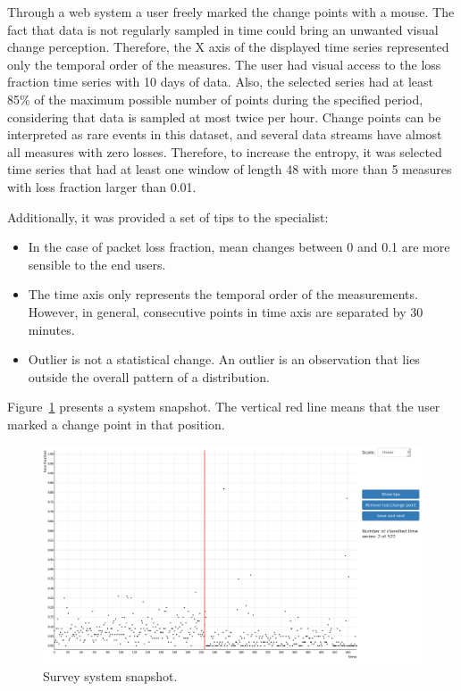 Through a web system a user freely marked the change points with a mouse.
The fact that data is not regularly sampled in time could bring an unwanted
visual change perception. Therefore, the X axis of the displayed time series
represented only the temporal order of the measures.
The user had visual access to the
loss fraction time series with 10 days of data.
Also, the selected series had at
least 85\% of the maximum possible number of points during the specified period,
considering that data is sampled at most twice per hour. Change points can
be interpreted as rare events in this dataset, and several data streams have
almost
all measures with zero losses. Therefore, to increase the entropy,
it was selected time series that had at least one window of length 48 with
more than 5 measures with loss fraction larger than 0.01.

Additionally, it was provided a set of tips to the specialist:

\begin{itemize}
    \item In the case of packet loss fraction, mean changes between 0 and 0.1
    are more sensible to the end users.
    \item The time axis only represents the temporal order of the measurements.
    However, in general, consecutive points in time axis are separated by 30
    minutes.
    \item Outlier is not a statistical change. An outlier is an observation that
    lies outside the overall pattern of a distribution.
\end{itemize}

Figure~\ref{fig:survey_system} presents a system snapshot.
The vertical red line means that the user marked a change point in that
position.

\begin{figure}[H]
    \centering
    \includegraphics[width=0.9\linewidth]{./figures/methodology/supervised_learning_try/survey_system.png}
    \caption{Survey system snapshot.}
\label{fig:survey_system}
\end{figure}%

